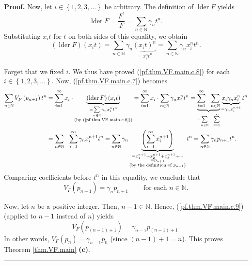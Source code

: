 \documentclass[numbers=enddot,12pt,final,onecolumn,notitlepage]{scrartcl}%
\theoremstyle{definition}
\newenvironment{proof}[1][Proof]{\noindent\textbf{#1.} }{\ \rule{0.5em}{0.5em}}
\let\sumnonlimits\sum
\renewcommand{\sum}{\sumnonlimits\limits}
\newenvironment{verlong}{}{}
\begin{document}
\begin{verlong}
\begin{proof}
Now, let $i\in\left\{  1,2,3,\ldots\right\}  $ be arbitrary. The definition of
$\operatorname*{lder}F$ yields%
\[
\operatorname*{lder}F=\dfrac{F^{\prime}}{F}=\sum_{n\in\mathbb{N}}\gamma
_{n}t^{n}.
\]
Substituting $x_{i}t$ for $t$ on both sides of this equality, we obtain%
\begin{equation}
\left(  \operatorname*{lder}F\right)  \left(  x_{i}t\right)  =\sum
_{n\in\mathbb{N}}\gamma_{n}\underbrace{\left(  x_{i}t\right)  ^{n}}%
_{=x_{i}^{n}t^{n}}=\sum_{n\in\mathbb{N}}\gamma_{n}x_{i}^{n}t^{n}.
\label{pf.thm.VF.main.c.8}%
\end{equation}


Forget that we fixed $i$. We thus have proved (\ref{pf.thm.VF.main.c.8}) for
each $i\in\left\{  1,2,3,\ldots\right\}  $. Now, (\ref{pf.thm.VF.main.c.7})
becomes%
\begin{align*}
\sum_{n\in\mathbb{N}}V_{F}\left(  p_{n+1}\right)  t^{n}  &  =\sum
_{i=1}^{\infty}x_{i}\cdot\underbrace{\left(  \operatorname*{lder}F\right)
\left(  x_{i}t\right)  }_{\substack{=\sum_{n\in\mathbb{N}}\gamma_{n}x_{i}%
^{n}t^{n}\\\text{(by (\ref{pf.thm.VF.main.c.8}))}}}=\sum_{i=1}^{\infty}%
x_{i}\cdot\sum_{n\in\mathbb{N}}\gamma_{n}x_{i}^{n}t^{n}=\underbrace{\sum
_{i=1}^{\infty}\ \ \sum_{n\in\mathbb{N}}}_{=\sum_{n\in\mathbb{N}}%
\ \ \sum_{i=1}^{\infty}}\underbrace{x_{i}\gamma_{n}x_{i}^{n}}_{=\gamma
_{n}x_{i}^{n+1}}t^{n}\\
&  =\sum_{n\in\mathbb{N}}\ \ \sum_{i=1}^{\infty}\gamma_{n}x_{i}^{n+1}%
t^{n}=\sum_{n\in\mathbb{N}}\gamma_{n}\underbrace{\left(  \sum_{i=1}^{\infty
}x_{i}^{n+1}\right)  }_{\substack{=x_{1}^{n+1}+x_{2}^{n+1}+x_{3}^{n+1}%
+\cdots\\=p_{n+1}\\\text{(by the definition of }p_{n+1}\text{)}}}t^{n}%
=\sum_{n\in\mathbb{N}}\gamma_{n}p_{n+1}t^{n}.
\end{align*}
Comparing coefficients before $t^{n}$ in this equality, we conclude that%
\begin{equation}
V_{F}\left(  p_{n+1}\right)  =\gamma_{n}p_{n+1}\ \ \ \ \ \ \ \ \ \ \text{for
each }n\in\mathbb{N}. \label{pf.thm.VF.main.c.9}%
\end{equation}


Now, let $n$ be a positive integer. Then, $n-1\in\mathbb{N}$. Hence,
(\ref{pf.thm.VF.main.c.9}) (applied to $n-1$ instead of $n$) yields
\[
V_{F}\left(  p_{\left(  n-1\right)  +1}\right)  =\gamma_{n-1}p_{\left(
n-1\right)  +1}.
\]
In other words, $V_{F}\left(  p_{n}\right)  =\gamma_{n-1}p_{n}$ (since
$\left(  n-1\right)  +1=n$). This proves Theorem \ref{thm.VF.main}
\textbf{(c)}.
\end{proof}
\end{verlong}
\end{document}
